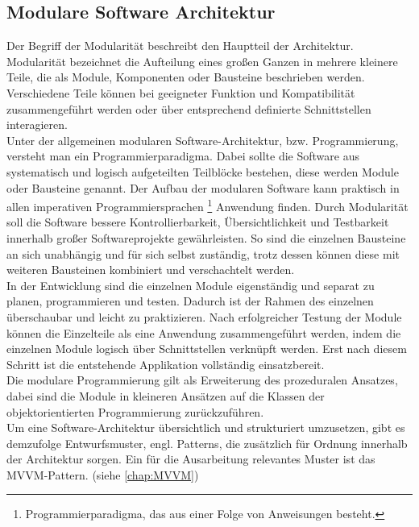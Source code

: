 \subsection{Modulare Software Architektur}
\label{chap:Modulare Software Architektur}
Der Begriff der Modularität beschreibt den Hauptteil der Architektur. Modularität bezeichnet die Aufteilung eines großen Ganzen in 
mehrere kleinere Teile, die als Module, Komponenten oder Bausteine beschrieben werden. Verschiedene Teile können bei geeigneter Funktion 
und Kompatibilität zusammengeführt werden oder über entsprechend definierte Schnittstellen interagieren. 
\\ 
Unter der allgemeinen modularen Software-Architektur, bzw. Programmierung, versteht man ein Programmierparadigma. Dabei sollte die Software aus 
systematisch und logisch aufgeteilten Teilblöcke bestehen, diese werden Module oder Bausteine genannt. Der Aufbau der modularen Software kann 
praktisch in allen imperativen Programmiersprachen \footnote{Programmierparadigma, das aus einer Folge von Anweisungen besteht.} 
Anwendung finden. Durch Modularität soll die Software bessere Kontrollierbarkeit, Übersichtlichkeit und Testbarkeit innerhalb großer 
Softwareprojekte gewährleisten. So sind die einzelnen Bausteine an sich unabhängig und für sich selbst zuständig, trotz dessen können 
diese mit weiteren Bausteinen kombiniert und verschachtelt werden. 
\\ 
In der Entwicklung sind die einzelnen Module eigenständig und separat zu planen, programmieren und testen. Dadurch ist der Rahmen des 
einzelnen überschaubar und leicht zu praktizieren. Nach erfolgreicher Testung der Module können die Einzelteile als eine Anwendung 
zusammengeführt werden, indem die einzelnen Module logisch über Schnittstellen verknüpft werden. Erst nach diesem Schritt ist die 
entstehende Applikation vollständig einsatzbereit.
\\ 
Die modulare Programmierung gilt als Erweiterung des prozeduralen Ansatzes, dabei sind die Module in kleineren Ansätzen auf die Klassen 
der objektorientierten Programmierung zurückzuführen. \cite{modularesoftware.2018s}
\\
Um eine Software-Architektur übersichtlich und strukturiert umzusetzen, gibt es demzufolge Entwurfsmuster, engl. Patterns, die zusätzlich für 
Ordnung innerhalb der Architektur sorgen. Ein für die Ausarbeitung relevantes Muster ist das MVVM-Pattern. (siehe \ref{chap:MVVM})

